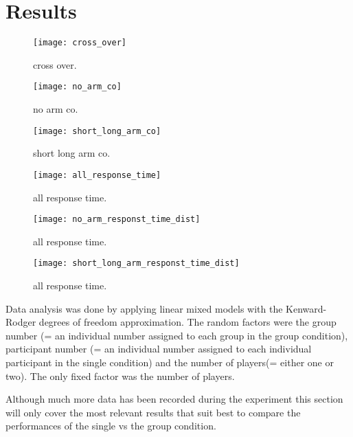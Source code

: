 \section{Results}

\begin{figure}
\centering
  \texttt{[image: cross\_over]}
  \caption{cross over.} 
  \label{fig:cross_over}
\end{figure}

\begin{figure}
\centering
  \texttt{[image: no\_arm\_co]}
  \caption{no arm co.} 
  \label{fig:no_arm_co}
\end{figure}

\begin{figure}
\centering
  \texttt{[image: short\_long\_arm\_co]}
  \caption{short long arm co.} 
  \label{fig:short_long_arm_co}
\end{figure}

\begin{figure}
\centering
  \texttt{[image: all\_response\_time]}
  \caption{all response time.} 
  \label{fig:all_response_time}
\end{figure}

\begin{figure}
\centering
  \texttt{[image: no\_arm\_responst\_time\_dist]}
  \caption{all response time.} 
  \label{fig:no_arm_responst_time_dist}
\end{figure}

\begin{figure}
\centering
  \texttt{[image: short\_long\_arm\_responst\_time\_dist]}
  \caption{all response time.} 
  \label{fig:short_long_arm_responst_time_dist}
\end{figure}



Data analysis was done by applying linear mixed models with the Kenward-Rodger degrees of freedom approximation. The random factors were the group number (= an individual number assigned to each group in the group condition), participant number (= an individual number assigned to each individual participant in the single condition) and the number of players(= either one or two). The only fixed factor was the number of players. 

 Although much more data has been recorded during the experiment this section will only cover the most relevant results that suit best to compare the performances of the single vs the group condition. 
 
